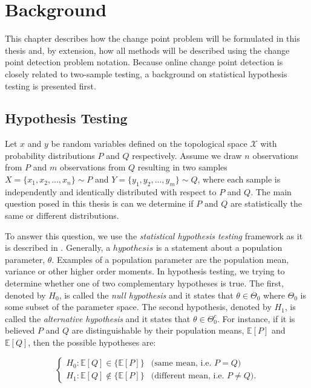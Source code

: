 \chapter{Background}
This chapter describes how the change point problem will be formulated in this thesis and, by extension, how all methods will be described using the change point detection problem notation. Because online change point detection is closely related to two-sample testing, a background on statistical hypothesis testing is presented first. 

\section{Hypothesis Testing}
\label{hyptesting}
Let $x$ and $y$ be random variables defined on the topological space $\mathcal{X}$ with probability distributions $P$ and $Q$ respectively. Assume we draw $n$ observations from $P$ and $m$ observations from $Q$ resulting in two samples $X=\{x_1, x_2, ...,x_n\} \sim P$ and $Y=\{y_1, y_2, ...,y_m\} \sim Q$, where each sample is independently and identically distributed with respect to $P$ and $Q$. The main question posed in this thesis is can we determine if $P$ and $Q$ are statistically the same or different distributions. 

To answer this question, we use the \textit{statistical hypothesis testing} framework as it is described in \cite{casella2002statistical}. Generally, a $hypothesis$ is a statement about a population parameter, $\theta$. Examples of a population parameter are the population mean, variance or other higher order moments. In hypothesis testing, we trying to determine whether one of two complementary hypotheses is true. The first, denoted by $H_0$, is called the \textit{null hypothesis} and it states that $\theta \in \Theta_0$ where $\Theta_0$ is some subset of the parameter space. The second hypothesis, denoted by $H_1$, is called the \textit{alternative hypothesis} and it states that $\theta \in \Theta_0^c$. For instance, if it is believed $P$ and $Q$ are distinguishable by their population means, $\mathbb{E}[P]$ and $\mathbb{E}[Q]$, then the possible hypotheses are:
 
\begin{equation}
\label{ex_hyp}
  \begin{cases}
    H_0: \mathbb{E}[Q] \in \{\mathbb{E}[P]\} & \text{(same mean, i.e. } P=Q) \\
    H_1: \mathbb{E}[Q] \notin \{\mathbb{E}[P] \} & \text{(different mean, i.e. } P \neq Q). 
  \end{cases}
\end{equation}

